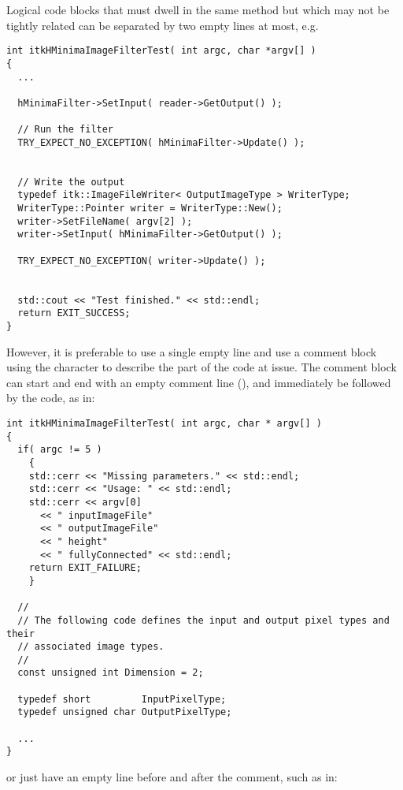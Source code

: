 Logical code blocks that must dwell in the same method but which may not be
tightly related can be separated by two empty lines at most, e.g.

\small
\begin{verbatim}
int itkHMinimaImageFilterTest( int argc, char *argv[] )
{
  ...

  hMinimaFilter->SetInput( reader->GetOutput() );

  // Run the filter
  TRY_EXPECT_NO_EXCEPTION( hMinimaFilter->Update() );


  // Write the output
  typedef itk::ImageFileWriter< OutputImageType > WriterType;
  WriterType::Pointer writer = WriterType::New();
  writer->SetFileName( argv[2] );
  writer->SetInput( hMinimaFilter->GetOutput() );

  TRY_EXPECT_NO_EXCEPTION( writer->Update() );


  std::cout << "Test finished." << std::endl;
  return EXIT_SUCCESS;
}
\end{verbatim}
\normalsize


However, it is preferable to use a single empty line and use a comment block
using the \code{//} character to describe the part of the code at issue. The
comment block can start and end with an empty comment line (\code{//}), and
immediately be followed by the code, as in:

\small
\begin{verbatim}
int itkHMinimaImageFilterTest( int argc, char * argv[] )
{
  if( argc != 5 )
    {
    std::cerr << "Missing parameters." << std::endl;
    std::cerr << "Usage: " << std::endl;
    std::cerr << argv[0]
      << " inputImageFile"
      << " outputImageFile"
      << " height"
      << " fullyConnected" << std::endl;
    return EXIT_FAILURE;
    }

  //
  // The following code defines the input and output pixel types and their
  // associated image types.
  //
  const unsigned int Dimension = 2;

  typedef short         InputPixelType;
  typedef unsigned char OutputPixelType;

  ...
}
\end{verbatim}
\normalsize

or just have an empty line before and after the comment, such as in:

